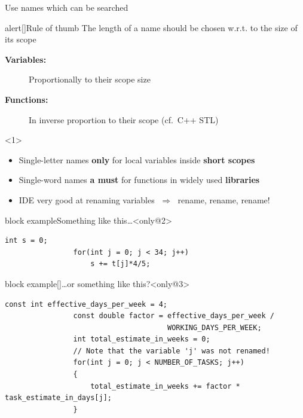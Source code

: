\begin{frame}[fragile]{Use names which can be searched}
    \vspace{-2mm}
    \begin{overlayarea}{\textwidth}{\textheight}
        \begin{varblock}{alert}[\textwidth]{Rule of thumb}
            The length of a name should be chosen w.r.t. to the size of its scope
        \end{varblock}
        \begin{center}
            \begin{minipage}{0.9\textwidth}
                \begin{description}
                    \item[\textbf{Variables:}] Proportionally to their scope size
                    \item[\textbf{Functions:}] In inverse proportion to their scope (cf.\ C++ STL)
                \end{description}
            \end{minipage}
        \end{center}
        \vspace{1mm}
        \begin{onlyenv}<1>
            \begin{itemize}
                \item Single-letter names \textbf{only} for local variables inside \textbf{short scopes}
                \item Single-word names \textbf{a must} for functions in widely used \textbf{libraries}
                \item IDE very good at renaming variables $\;\Rightarrow\;$ rename, rename, rename!
            \end{itemize}
        \end{onlyenv}
        \vspace{-4mm}
        \begin{varblock}{block example}{Something like this\ldots}<only@2>
            \begin{lstlisting}[style=MyCpp]
                int s = 0;
                for(int j = 0; j < 34; j++)
                    s += t[j]*4/5;
            \end{lstlisting}
        \end{varblock}
        \begin{varblock}{block example}[\textwidth]{\ldots{}or something like this?}<only@3>
            \begin{lstlisting}[style=MyCpp]
                const int effective_days_per_week = 4;
                const double factor = effective_days_per_week /
                                      WORKING_DAYS_PER_WEEK;
                int total_estimate_in_weeks = 0;
                // Note that the variable 'j' was not renamed!
                for(int j = 0; j < NUMBER_OF_TASKS; j++)
                {
                    total_estimate_in_weeks += factor * task_estimate_in_days[j];
                }
            \end{lstlisting}
        \end{varblock}
    \end{overlayarea}
\end{frame}
